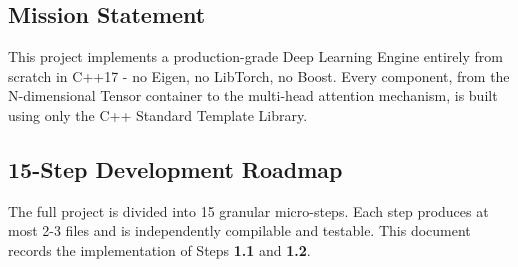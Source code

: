 \documentclass[12pt, a4paper]{article}
\begin{document}
\subsection{Mission Statement}

This project implements a production-grade Deep Learning Engine entirely from
scratch in C++17 - no Eigen, no LibTorch, no Boost. Every component, from the
N-dimensional Tensor container to the multi-head attention mechanism, is built
using only the C++ Standard Template Library.

\subsection{15-Step Development Roadmap}

The full project is divided into 15 granular micro-steps.  Each step produces
at most 2-3 files and is independently compilable and testable.  This document
records the implementation of Steps \textbf{1.1} and \textbf{1.2}.
\end{document}
